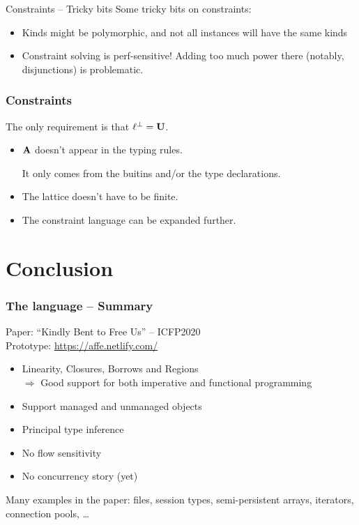 \documentclass[aspectratio=169,dvipsnames,svgnames,10pt]{beamer}
\newcommand\Y{{\color{Green}{\ding{52}}}}
\newcommand\N{{\color{Red}{\ding{56}}}}
\begin{document}
\begin{frame}{Constraints -- Tricky bits}
  Some tricky bits on constraints:
  \begin{itemize}
  \item Kinds might be polymorphic, and not all instances will
    have the same kinds
  \item Constraint solving is perf-sensitive! Adding too much power
    there (notably, disjunctions) is problematic.
  \end{itemize}
  
\end{frame}

\begin{frame}
  \frametitle{Constraints}
  The only requirement is that $\ell^\bot = \mathbf{U}$.\pause

  \begin{itemize}
  \item $\mathbf{A}$ doesn't appear in the typing rules.

    It only comes from the buitins and/or the type declarations.
  \item The lattice doesn't have to be finite.
  \item The constraint language can be expanded further.
  \end{itemize}
\end{frame}



\section*{Conclusion}



\begin{frame}
  \frametitle{The \lang language -- Summary}

  Paper: ``Kindly Bent to Free Us'' -- ICFP2020\\
  Prototype: \url{https://affe.netlify.com/}  
  
  \begin{itemize}
  \item[\Y] Linearity, Closures, Borrows and Regions\\
    $\Rightarrow$ Good support for both imperative and functional programming
  \item[\Y] Support managed and unmanaged objects
  \item[\Y] Principal type inference
  \item[\N] No flow sensitivity
  \item[\N] No concurrency story (yet)
  \end{itemize}
  
  Many examples in the paper: files, session types, semi-persistent arrays, iterators, connection pools, \dots
\end{frame}
\end{document}
